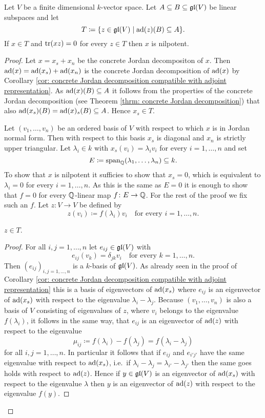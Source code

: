 \begin{lem}\label{lem: Cartan's criterion technical lemma}
 Let $V$ be a finite dimensional $k$-vector space. Let $A \subseteq B \subseteq \mathfrak{gl}(V)$ be linear subspaces and let
 \[
  T \coloneqq \{z \in \mathfrak{gl}(V) \mid \operatorname{ad}(z)(B) \subseteq A\}.
 \]
 If $x \in T$ and $\operatorname{tr}(xz) = 0$ for every $z \in T$ then $x$ is nilpotent.
\end{lem}
\begin{proof}
 Let $x = x_s + x_n$ be the concrete Jordan decompositon of $x$. Then $\operatorname{ad}(x) = \operatorname{ad}(x_s) + \operatorname{ad}(x_n)$ is the concrete Jordan decomposition of $\operatorname{ad}(x)$ by Corollary \ref{cor: concrete Jordan decomposition compatible with adjoint representation}. As $\operatorname{ad}(x)(B) \subseteq A$ it follows from the properties of the concrete Jordan decomposition (see Theorem \ref{thrm: concrete Jordan decomposition}) that also $\operatorname{ad}(x_s)(B) = \operatorname{ad}(x)_s(B) \subseteq A$. Hence $x_s \in T$.
 
 Let $(v_1, \dotsc, v_n)$ be an ordered basis of $V$ with respect to which $x$ is in Jordan normal form. Then with respect to this basis $x_s$ is diagonal and $x_n$ is strictly upper triangular. Let $\lambda_i \in k$ with $x_s(v_i) = \lambda_i v_i$ for every $i = 1, \dotsc, n$ and set
 \[
  E \coloneqq \operatorname{span}_{\mathbb{Q}}(\lambda_1, \dotsc, \lambda_n) \subseteq k.
 \]
 To show that $x$ is nilpotent it sufficies to show that $x_s = 0$, which is equivalent to $\lambda_i = 0$ for every $i = 1, \dotsc, n$. As this is the same as $E = 0$ it is enough to show that $f = 0$ for every $\mathbb{Q}$-linear map $f \colon E \to \mathbb{Q}$. For the rest of the proof we fix such an $f$. Let $z \colon V \to V$ be defined by
 \[
  z(v_i) \coloneqq f(\lambda_i) v_i \quad \text{for every $i = 1, \dotsc, n$}.
 \]
 
 \begin{claim*}
  $z \in T$.
 \end{claim*}
 \begin{proof}
  For all $i,j = 1, \dotsc, n$ let $e_{ij} \in \mathfrak{gl}(V)$ with
  \[
   e_{ij}(v_k) = \delta_{jk} v_i \quad \text{for every $k = 1, \dotsc, n$}.
  \]
  Then $(e_{ij})_{i,j = 1, \dotsc, n}$ is a $k$-basis of $\mathfrak{gl}(V)$. As already seen in the proof of Corollary \ref{cor: concrete Jordan decomposition compatible with adjoint representation} this is a basis of eigenvectors of $\operatorname{ad}(x_s)$ where $e_{ij}$ is an eigenvector of $\operatorname{ad}(x_s)$ with respect to the eigenvalue $\lambda_i - \lambda_j$. Because $(v_1, \dotsc, v_n)$ is also a basis of $V$ consisting of eigenvalues of $z$, where $v_i$ belongs to the eigenvalue $f(\lambda_i)$, it follows in the same way, that $e_{ij}$ is an eigenvector of $\operatorname{ad}(z)$ with respect to the eigenvalue
  \[
   \mu_{ij} \coloneqq f(\lambda_i) - f(\lambda_j) = f(\lambda_i - \lambda_j)
  \]
  for all $i,j = 1, \dotsc, n$. In particular it follows that if $e_{ij}$ and $e_{i'j'}$ have the same eigenvalue with respect to $\operatorname{ad}(x_s)$, i.e.\ if $\lambda_i - \lambda_j = \lambda_{i'} - \lambda_{j'}$ then the same goes holds with respect to $\operatorname{ad}(z)$. Hence if $y \in \mathfrak{gl}(V)$ is an eigenvector of $\operatorname{ad}(x_s)$ with respect to the eigenvalue $\lambda$ then $y$ is an eigenvector of $\operatorname{ad}(z)$ with respect to the eigenvalue $f(y)$.
  

\end{proof}
\end{proof}
